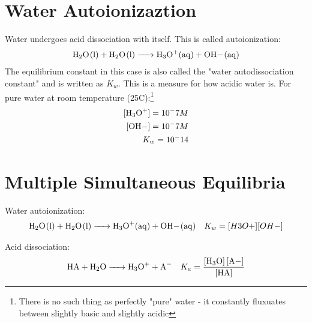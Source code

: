 \documentclass{article}  %
\begin{document}
\section*{Water Autoionizaztion}
Water undergoes acid dissociation with itself. This is called autoionization:
\begin{equation*}
    \begin{aligned}
        \ce{H2O_(l) + H2O_(l) -> H3O+_(aq) + OH-_(aq)}
    \end{aligned}
\end{equation*}
The equilibrium constant in this case is also called the "water autodissociation constant" and is written as $K_w$. This is a measure for how acidic water is.
\newline
For pure water at room temperature (25C):\footnote{There is no such thing as perfectly "pure" water - it constantly fluxuates between slightly basic and slightly acidic}
\begin{equation*}
    \begin{aligned}
        \ce{[H3O+]} = 10^-7 M \\
        \ce{[OH-]} = 10^-7 M \\
        K_w = 10^-14
    \end{aligned}
\end{equation*}



\section*{Multiple Simultaneous Equilibria}
Water autoionization:
\begin{equation*}
    \begin{aligned}
        \ce{H2O_(l) + H2O_(l) -> H3O+_(aq) + OH-_(aq)} \quad K_w = [H3O+][OH-]
    \end{aligned}
\end{equation*}

Acid dissociation: 
\begin{equation*}
    \begin{aligned}
        \ce{HA + H2O -> H3O+ + A-} \quad K_a = \ce{\frac{[H3O] [A-]}{[HA]}}
    \end{aligned}
\end{equation*}
\end{document}
